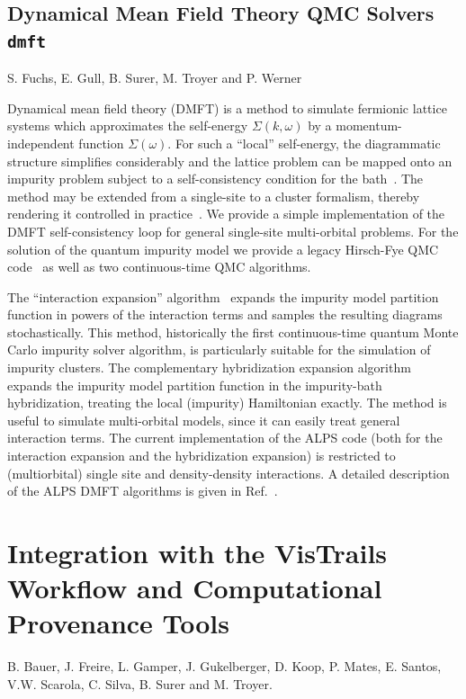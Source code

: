 \documentclass[12pt]{iopart}
\begin{document}
\subsection{Dynamical Mean Field Theory QMC Solvers {\tt dmft}}

 S. Fuchs, E. Gull, B. Surer, M. Troyer and P. Werner

\medskip

Dynamical mean field theory (DMFT) is a method to simulate fermionic lattice systems which approximates the self-energy $\Sigma(k,\omega)$ by a momentum-independent 
function $\Sigma(\omega)$. For such a ``local'' self-energy, the diagrammatic structure simplifies considerably and the lattice problem can be mapped onto an impurity problem subject to a self-consistency condition for the bath~\cite{Georges96,Kotliar06}. The method may be extended from a single-site to a cluster formalism, thereby rendering it controlled in practice~\cite{Maier05}.
We provide a simple implementation of the DMFT self-consistency loop for general single-site multi-orbital problems.
For the solution of the quantum impurity model we provide a legacy Hirsch-Fye QMC code~\cite{Hirsch86} as well as two continuous-time QMC algorithms.

The ``interaction expansion'' algorithm~\cite{Rubtsov04,Rubtsov05} expands the impurity model partition function in powers of the interaction terms and samples the resulting diagrams stochastically. This method, historically
the first continuous-time quantum Monte Carlo impurity solver algorithm, is particularly suitable for the simulation of impurity clusters.
The complementary hybridization expansion algorithm~\cite{Werner06,Werner06Kondo} expands the impurity model partition function in the impurity-bath hybridization, treating 
the local (impurity) Hamiltonian exactly. 
The method is useful to simulate multi-orbital models, since it can easily treat general interaction terms. 
The current implementation of the ALPS code (both for the interaction expansion and the hybridization expansion) is restricted to (multiorbital) single site and density-density interactions.
A detailed description of the ALPS DMFT algorithms is given in Ref.~\cite{ALPSDMFT}.




\section{Integration with the VisTrails Workflow and Computational Provenance Tools}
 B. Bauer, J. Freire, L. Gamper, J. Gukelberger, D. Koop, P. Mates, E. Santos, V.W. Scarola, C. Silva, B. Surer and M. Troyer.
\end{document}
